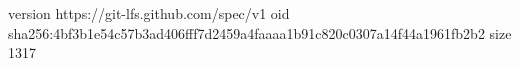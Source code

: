 version https://git-lfs.github.com/spec/v1
oid sha256:4bf3b1e54c57b3ad406fff7d2459a4faaaa1b91c820c0307a14f44a1961fb2b2
size 1317
